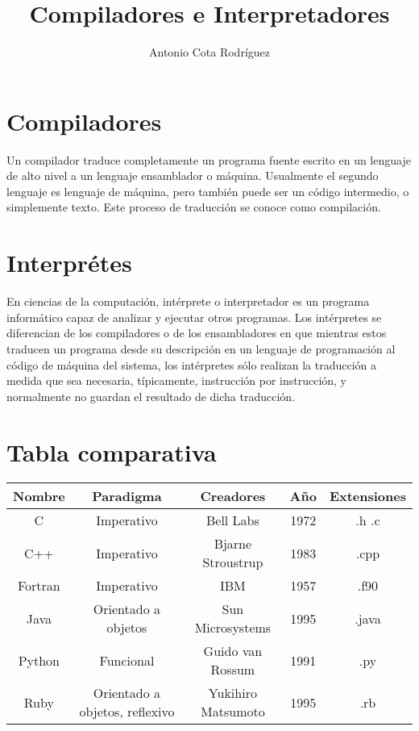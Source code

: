 \documentclass{article}
\title{Compiladores e Interpretadores}
\author{Antonio Cota Rodr\'iguez}
\date{}
\begin{document}
\maketitle

\section{Compiladores}
Un compilador traduce completamente un programa fuente escrito en un lenguaje de alto nivel a un lenguaje ensamblador o m\'aquina. Usualmente el segundo lenguaje es lenguaje de m\'aquina, pero tambi\'en puede ser un c\'odigo intermedio, o simplemente texto. Este proceso de traducci\'on se conoce como compilaci\'on.

\section{Interpr\'etes}
En ciencias de la computaci\'on, int\'erprete o interpretador es un programa inform\'atico capaz de analizar y ejecutar otros programas. Los int\'erpretes se diferencian de los compiladores o de los ensambladores en que mientras estos traducen un programa desde su descripci\'on en un lenguaje de programaci\'on al c\'odigo de m\'aquina del sistema, los int\'erpretes sólo realizan la traducci\'on a medida que sea necesaria, t\'ipicamente, instrucci\'on por instrucci\'on, y normalmente no guardan el resultado de dicha traducci\'on.

\section{Tabla comparativa}
\begin{tabular}{|c | c | c | c | c|}

\hline
Nombre & Paradigma & Creadores & A\~no & Extensiones\\ \hline \hline

C & Imperativo & Bell Labs & 1972 & .h .c \\ \hline

C++ & Imperativo & Bjarne Stroustrup  & 1983 & .cpp \\ \hline

Fortran & Imperativo & IBM & 1957 & .f90\\ \hline

Java & Orientado a objetos & Sun Microsystems & 1995 & .java\\ \hline

Python & Funcional & Guido van Rossum & 1991 & .py\\ \hline

Ruby & Orientado a objetos, reflexivo & Yukihiro Matsumoto & 1995 & .rb \\ \hline

\end{tabular}
\end{document}
